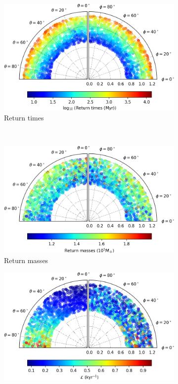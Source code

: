 \begin{figure}[h]
    \centering
    \begin{subfigure}[t]{0.4\textwidth}
        \includegraphics[width = \textwidth]{"../Files/Week 13/images/4_time"}
        \caption{Return times}
    \end{subfigure}
    ~ 
    \begin{subfigure}[t]{0.4\textwidth}
        \includegraphics[width=\textwidth]{"../Files/Week 13/images/4_mass"}
        \caption{Return masses}
    \end{subfigure}
    \begin{subfigure}[t]{0.4\textwidth}
        \includegraphics[width=\textwidth]{"../Files/Week 13/images/4_lyapunov"}

\end{subfigure}
\end{figure}
